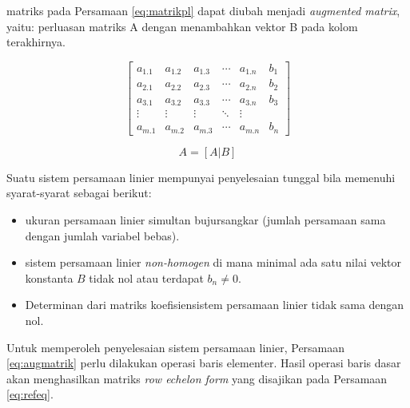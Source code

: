 \documentclass[]{book}
\providecommand{\tightlist}{%
  \setlength{\itemsep}{0pt}\setlength{\parskip}{0pt}}
\theoremstyle{definition}
\theoremstyle{definition}
\theoremstyle{definition}
\theoremstyle{remark}
\let\BeginKnitrBlock\begin \let\EndKnitrBlock\end
\begin{document}
matriks pada Persamaan \eqref{eq:matrikpl} dapat diubah menjadi \emph{augmented matrix}, yaitu: perluasan matriks A dengan menambahkan vektor B pada kolom terakhirnya.

\begin{equation}
\begin{bmatrix}
     a_{1.1} & a_{1.2} & a_{1.3} &\cdots& a_{1.n} & b_1     \\[0.3em]
     a_{2.1} & a_{2.2} & a_{2.3} &\cdots& a_{2.n} & b_2     \\[0.3em]
     a_{3.1} & a_{3.2} & a_{3.3} &\cdots& a_{3.n} & b_3     \\[0.3em]
     \vdots  & \vdots  & \vdots &\ddots& \vdots            \\[0.3em]
     a_{m.1} & a_{m.2} & a_{m.3} &\cdots& a_{m.n} & b_n
     \end{bmatrix}
  \label{eq:augmatrik}
\end{equation}

\begin{equation}
A=\left[A|B\right]
  \label{eq:augmatrik2}
\end{equation}

\BeginKnitrBlock{theorem}[spltheorem]
\protect\hypertarget{thm:unnamed-chunk-133}{}{\label{thm:unnamed-chunk-133} {} }Suatu sistem persamaan linier mempunyai penyelesaian tunggal bila memenuhi syarat-syarat sebagai berikut:
\EndKnitrBlock{theorem}

\begin{itemize}
\tightlist
\item
  ukuran persamaan linier simultan bujursangkar (jumlah persamaan sama dengan jumlah variabel bebas).
\item
  sistem persamaan linier \emph{non-homogen} di mana minimal ada satu nilai vektor konstanta \(B\) tidak nol atau terdapat \(b_{n}\neq 0\).
\item
  Determinan dari matriks koefisiensistem persamaan linier tidak sama dengan nol.
\end{itemize}

Untuk memperoleh penyelesaian sistem persamaan linier, Persamaan \eqref{eq:augmatrik} perlu dilakukan operasi baris elementer. Hasil operasi baris dasar akan menghasilkan matriks \emph{row echelon form} yang disajikan pada Persamaan \eqref{eq:refeq}.
\end{document}
